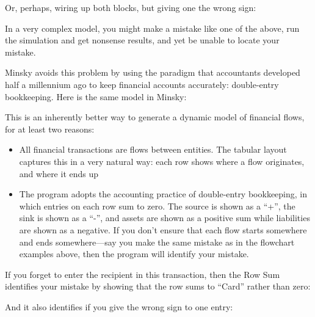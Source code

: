 \begin{center}
\end{center}

Or, perhaps, wiring up both blocks, but giving one the wrong sign:

\begin{center}
\end{center}

In a very complex model, you might make a mistake like one of the above, run the simulation and get nonsense results, and yet be unable to locate your mistake.


Minsky avoids this problem by using the paradigm that accountants
developed half a millennium ago to keep financial accounts accurately:
double-entry bookkeeping. Here is the same model in Minsky:

\begin{center}
\end{center}

This is an inherently better way to generate a dynamic model of financial flows, for at least two reasons:
\begin{itemize}
\item All financial transactions are flows between entities. The
  tabular layout captures this in a very natural way: each row shows
  where a flow originates, and where it ends up
\item The program adopts the accounting practice of double-entry
  bookkeeping, in which entries on each row sum to zero. The source is
  shown as a ``+'', the sink is shown as a ``-'', and assets are shown
  as a positive sum while liabilities are shown as a negative. If you
  don't ensure that each flow starts somewhere and ends
  somewhere---say you make the same mistake as in the flowchart
  examples above, then the program will identify your mistake.
\end{itemize}

If you forget to enter the recipient in this transaction, then the Row
Sum identifies your mistake by showing that the row sums to ``Card''
rather than zero:

\begin{center}
\end{center}

And it also identifies if you give the wrong sign to one entry:

\begin{center}
\end{center}

